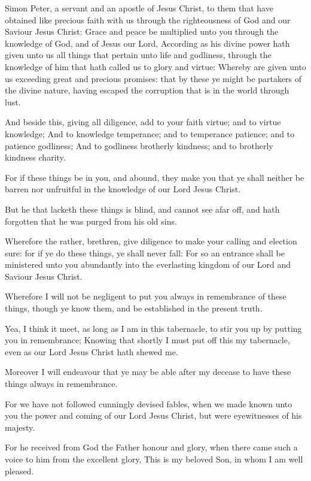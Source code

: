 \Chapter
\Verse Simon Peter, a servant and an apostle of Jesus Christ, to them that have obtained like precious faith with us through the righteousness of God and our Saviour Jesus Christ: \Verse Grace and peace be multiplied unto you through the knowledge of God, and of Jesus our Lord, \Verse According as his divine power hath given unto us all things that pertain unto life and godliness, through the knowledge of him that hath called us to glory and virtue: \Verse Whereby are given unto us exceeding great and precious promises: that by these ye might be partakers of the divine nature, having escaped the corruption that is in the world through lust.

\Verse And beside this, giving all diligence, add to your faith virtue; and to virtue knowledge; \Verse And to knowledge temperance; and to temperance patience; and to patience godliness; \Verse And to godliness brotherly kindness; and to brotherly kindness charity.

\Verse For if these things be in you, and abound, they make you that ye shall neither be barren nor unfruitful in the knowledge of our Lord Jesus Christ.

\Verse But he that lacketh these things is blind, and cannot see afar off, and hath forgotten that he was purged from his old sins.

\Verse Wherefore the rather, brethren, give diligence to make your calling and election sure: for if ye do these things, ye shall never fall: \Verse For so an entrance shall be ministered unto you abundantly into the everlasting kingdom of our Lord and Saviour Jesus Christ.

\Verse Wherefore I will not be negligent to put you always in remembrance of these things, though ye know them, and be established in the present truth.

\Verse Yea, I think it meet, as long as I am in this tabernacle, to stir you up by putting you in remembrance; \Verse Knowing that shortly I must put off this my tabernacle, even as our Lord Jesus Christ hath shewed me.

\Verse Moreover I will endeavour that ye may be able after my decease to have these things always in remembrance.

\Verse For we have not followed cunningly devised fables, when we made known unto you the power and coming of our Lord Jesus Christ, but were eyewitnesses of his majesty.

\Verse For he received from God the Father honour and glory, when there came such a voice to him from the excellent glory, This is my beloved Son, in whom I am well pleased.

